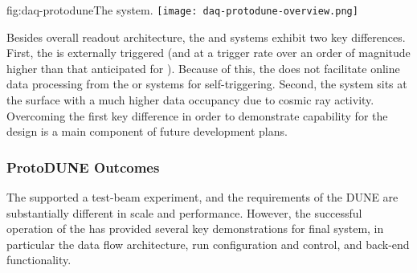 \begin{dunefigure}{fig:daq-protodune}{The   system.}
  \texttt{[image: daq-protodune-overview.png]}
\end{dunefigure}

Besides overall readout architecture, the  and   systems exhibit two key differences. 
First, the   is externally triggered (and at a trigger rate over an order of magnitude higher than that anticipated for ). Because of this, the   does not facilitate online data processing from the  or  systems for self-triggering. 
Second, the  system sits at the surface with a much higher data occupancy due to cosmic ray activity.
Overcoming the first key difference in order to demonstrate  capability for the   design is a main component of future  development plans.


\subsubsection{ProtoDUNE Outcomes}

The   supported a test-beam experiment, and the requirements of the DUNE  are substantially different in scale and performance.
However, the successful operation of the   has provided several key demonstrations for final system, in particular the data flow architecture, run configuration and control, and back-end functionality.


